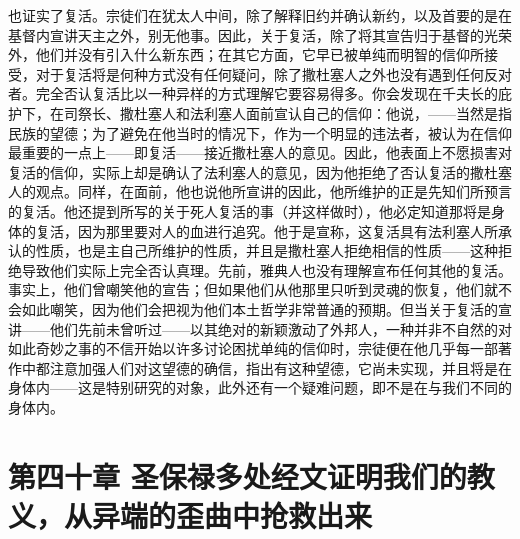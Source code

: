 也证实了复活。宗徒们在犹太人中间，除了解释旧约并确认新约，以及首要的是在基督内宣讲天主之外，别无他事。因此，关于复活，除了将其宣告归于基督的光荣外，他们并没有引入什么新东西；在其它方面，它早已被单纯而明智的信仰所接受，对于复活将是何种方式没有任何疑问，除了撒杜塞人之外也没有遇到任何反对者。完全否认复活比以一种异样的方式理解它要容易得多。你会发现在千夫长的庇护下，在司祭长、撒杜塞人和法利塞人面前宣认自己的信仰：他说，——当然是指民族的望德；为了避免在他当时的情况下，作为一个明显的违法者，被认为在信仰最重要的一点上——即复活——接近撒杜塞人的意见。因此，他表面上不愿损害对复活的信仰，实际上却是确认了法利塞人的意见，因为他拒绝了否认复活的撒杜塞人的观点。同样，在面前，他也说他所宣讲的因此，他所维护的正是先知们所预言的复活。他还提到所写的关于死人复活的事（并这样做时），他必定知道那将是身体的复活，因为那里要对人的血进行追究。他于是宣称，这复活具有法利塞人所承认的性质，也是主自己所维护的性质，并且是撒杜塞人拒绝相信的性质——这种拒绝导致他们实际上完全否认真理。先前，雅典人也没有理解宣布任何其他的复活。事实上，他们曾嘲笑他的宣告；但如果他们从他那里只听到灵魂的恢复，他们就不会如此嘲笑，因为他们会把视为他们本土哲学非常普通的预期。但当关于复活的宣讲——他们先前未曾听过——以其绝对的新颖激动了外邦人，一种并非不自然的对如此奇妙之事的不信开始以许多讨论困扰单纯的信仰时，宗徒便在他几乎每一部著作中都注意加强人们对这望德的确信，指出有这种望德，它尚未实现，并且将是在身体内——这是特别研究的对象，此外还有一个疑难问题，即不是在与我们不同的身体内。\par


\section{第四十章 圣保禄多处经文证明我们的教义，从异端的歪曲中抢救出来}

